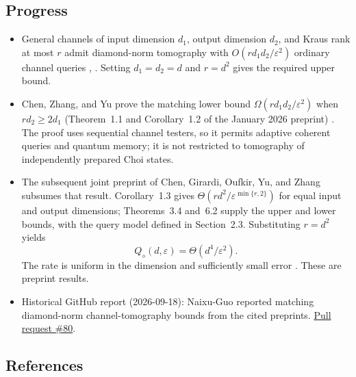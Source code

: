 \subsection*{Progress}

\begin{itemize}
  \item General channels of input dimension $d_1$, output dimension $d_2$, and Kraus rank at most $r$ admit diamond-norm tomography with $O(rd_1d_2/\varepsilon^2)$ ordinary channel queries , . Setting $d_1=d_2=d$ and $r=d^2$ gives the required upper bound.

  \item Chen, Zhang, and Yu prove the matching lower bound $\Omega(rd_1d_2/\varepsilon^2)$ when $rd_2\geq2d_1$ (Theorem~1.1 and Corollary~1.2 of the January 2026 preprint) . The proof uses sequential channel testers, so it permits adaptive coherent queries and quantum memory; it is not restricted to tomography of independently prepared Choi states.

  \item The subsequent joint preprint of Chen, Girardi, Oufkir, Yu, and Zhang subsumes that result. Corollary~1.3 gives $\Theta(rd^2/\varepsilon^{\min\{r,2\}})$ for equal input and output dimensions; Theorems~3.4 and~6.2 supply the upper and lower bounds, with the query model defined in Section~2.3. Substituting $r=d^2$ yields \begin{equation}Q_\diamond(d,\varepsilon)=\Theta(d^4/\varepsilon^2).\label{eq:d3e3-optimal}\end{equation} The rate is uniform in the dimension and sufficiently small error . These are preprint results.

  \item Historical GitHub report (2026-09-18): Naixu-Guo reported matching diamond-norm channel-tomography bounds from the cited preprints. \href{https://github.com/Naixu-Guo/quantum-open-problems/pull/80}{Pull request \#80}.
\end{itemize}

\subsection*{References}

